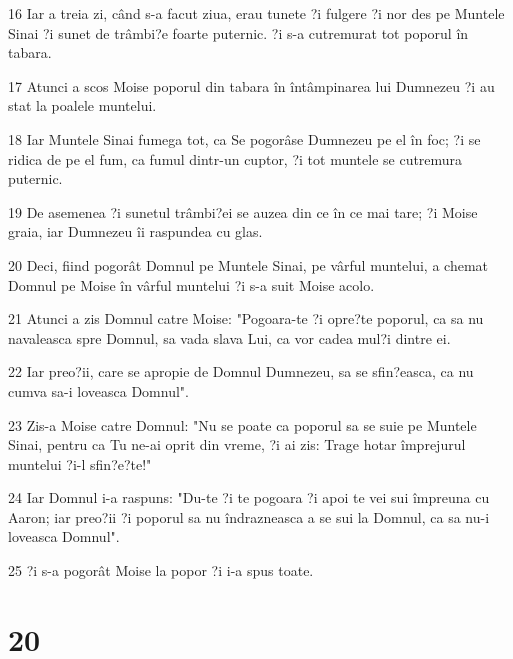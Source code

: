 \par 16 Iar a treia zi, când s-a facut ziua, erau tunete ?i fulgere ?i nor des pe Muntele Sinai ?i sunet de trâmbi?e foarte puternic. ?i s-a cutremurat tot poporul în tabara.
\par 17 Atunci a scos Moise poporul din tabara în întâmpinarea lui Dumnezeu ?i au stat la poalele muntelui.
\par 18 Iar Muntele Sinai fumega tot, ca Se pogorâse Dumnezeu pe el în foc; ?i se ridica de pe el fum, ca fumul dintr-un cuptor, ?i tot muntele se cutremura puternic.
\par 19 De asemenea ?i sunetul trâmbi?ei se auzea din ce în ce mai tare; ?i Moise graia, iar Dumnezeu îi raspundea cu glas.
\par 20 Deci, fiind pogorât Domnul pe Muntele Sinai, pe vârful muntelui, a chemat Domnul pe Moise în vârful muntelui ?i s-a suit Moise acolo.
\par 21 Atunci a zis Domnul catre Moise: "Pogoara-te ?i opre?te poporul, ca sa nu navaleasca spre Domnul, sa vada slava Lui, ca vor cadea mul?i dintre ei.
\par 22 Iar preo?ii, care se apropie de Domnul Dumnezeu, sa se sfin?easca, ca nu cumva sa-i loveasca Domnul".
\par 23 Zis-a Moise catre Domnul: "Nu se poate ca poporul sa se suie pe Muntele Sinai, pentru ca Tu ne-ai oprit din vreme, ?i ai zis: Trage hotar împrejurul muntelui ?i-l sfin?e?te!"
\par 24 Iar Domnul i-a raspuns: "Du-te ?i te pogoara ?i apoi te vei sui împreuna cu Aaron; iar preo?ii ?i poporul sa nu îndrazneasca a se sui la Domnul, ca sa nu-i loveasca Domnul".
\par 25 ?i s-a pogorât Moise la popor ?i i-a spus toate.

\chapter{20}

